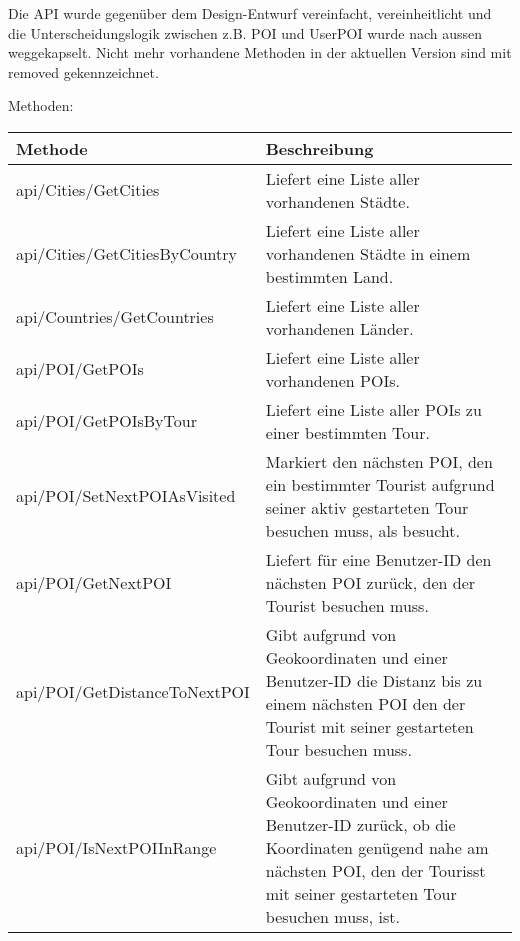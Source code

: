 Die API wurde gegenüber dem Design-Entwurf vereinfacht, vereinheitlicht und die Unterscheidungslogik zwischen z.B. POI und UserPOI wurde nach aussen weggekapselt.
Nicht mehr vorhandene Methoden in der aktuellen Version sind mit removed gekennzeichnet.

Methoden:

\begin{longtabu} to \textwidth { | l | X[l] | }
\hline
\textbf{Methode} & \textbf{Beschreibung} \\
\hline
\endhead

api/Cities/GetCities &
Liefert eine Liste aller vorhandenen St\"adte.\\\hline
api/Cities/GetCitiesByCountry &
Liefert eine Liste aller vorhandenen St\"adte in einem bestimmten Land.\\\hline
  api/Countries/GetCountries &
Liefert eine Liste aller vorhandenen L\"ander.\\\hline
api/POI/GetPOIs &
Liefert eine Liste aller vorhandenen POIs.\\\hline
api/POI/GetPOIsByTour &
Liefert eine Liste aller POIs zu einer bestimmten Tour.\\\hline
api/POI/SetNextPOIAsVisited &
Markiert den n\"achsten POI, den ein bestimmter Tourist aufgrund seiner aktiv gestarteten
  Tour besuchen muss, als besucht.\\\hline
  api/POI/GetNextPOI &
Liefert f\"ur eine Benutzer-ID den n\"achsten POI zur\"uck, den der Tourist besuchen
  muss.\\\hline
  api/POI/GetDistanceToNextPOI &
Gibt aufgrund von Geokoordinaten und einer Benutzer-ID die Distanz bis zu einem n\"achsten POI
  den der Tourist mit seiner gestarteten Tour besuchen muss.\\\hline
api/POI/IsNextPOIInRange &
Gibt aufgrund von Geokoordinaten und einer Benutzer-ID zur\"uck, ob die Koordinaten gen\"ugend
  nahe am n\"achsten POI, den der Tourisst mit seiner gestarteten Tour besuchen muss, ist.


\end{longtabu}
